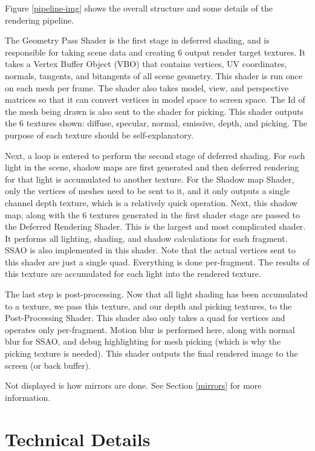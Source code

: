 \documentclass[oneside]{book}
\begin{document}
      Figure \ref{pipeline-img} shows the overall structure and some details of the rendering pipeline.

      The Geometry Pass Shader is the first stage in deferred shading, and is responsible for taking scene data and creating 6 output render target textures. It takes a Vertex Buffer Object (VBO) that contains vertices, UV coordinates, normals, tangents, and bitangents of all scene geometry. This shader is run once on each mesh per frame. The shader also takes model, view, and perspective matrices so that it can convert vertices in model space to screen space. The Id of the mesh being drawn is also sent to the shader for picking. This shader outputs the 6 textures shown: diffuse, specular, normal, emissive, depth, and picking. The purpose of each texture should be self-explanatory.

      Next, a loop is entered to perform the second stage of deferred shading. For each light in the scene, shadow maps are first generated and then deferred rendering for that light is accumulated to another texture. For the Shadow map Shader, only the vertices of meshes need to be sent to it, and it only outputs a single channel depth texture, which is a relatively quick operation. Next, this shadow map, along with the 6 textures generated in the first shader stage are passed to the Deferred Rendering Shader. This is the largest and most complicated shader. It performs all lighting, shading, and shadow calculations for each fragment. SSAO is also implemented in this shader. Note that the actual vertices sent to this shader are just a single quad. Everything is done per-fragment. The results of this texture are accumulated for each light into the rendered texture.

      The last step is post-processing. Now that all light shading has been accumulated to a texture, we pass this texture, and our depth and picking textures, to the Post-Processing Shader. This shader also only takes a quad for vertices and operates only per-fragment. Motion blur is performed here, along with normal blur for SSAO, and debug highlighting for mesh picking (which is why the picking texture is needed). This shader outputs the final rendered image to the screen (or back buffer).

      Not displayed is how mirrors are done. See Section \ref{mirrors} for more information.


  \section{Technical Details} \label{technical-objectives}
\end{document}
